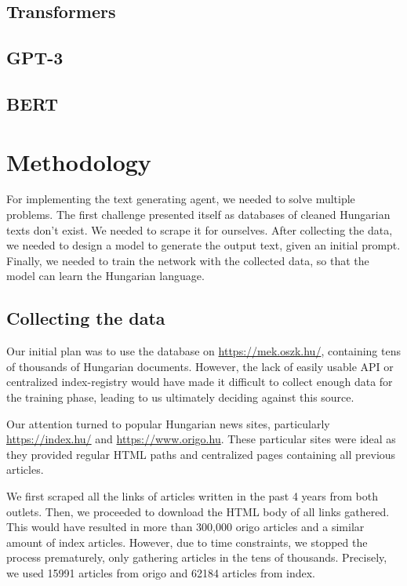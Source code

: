 \documentclass[journal]{IEEEtai}
\begin{document}
\subsection{Transformers}

\subsection{GPT-3}

\subsection{BERT}


\section{Methodology}
For implementing the text generating agent, we needed to solve multiple problems. The first challenge presented itself as databases of cleaned Hungarian texts don't exist. We needed to scrape it for ourselves. After collecting the data, we needed to design a model to generate the output text, given an initial prompt. Finally, we needed to train the network with the collected data, so that the model can learn the Hungarian language.  

\subsection{Collecting the data}
Our initial plan was to use the database on \href{https://mek.oszk.hu/}{https://mek.oszk.hu/}, containing tens of thousands of Hungarian documents. However, the lack of easily usable API or centralized index-registry would have made it difficult to collect enough data for the training phase, leading to us ultimately deciding against this source.

Our attention turned to popular Hungarian news sites, particularly \href{https://index.hu/}{https://index.hu/} and \href{https://www.origo.hu}{https://www.origo.hu}. These particular sites were ideal as they provided regular HTML paths and centralized pages containing all previous articles. 

We first scraped all the links of articles written in the past 4 years from both outlets. Then, we proceeded to download the HTML body of all links gathered. This would have resulted in more than 300,000 origo articles and a similar amount of index articles. However, due to time constraints, we stopped the process prematurely, only gathering articles in the tens of thousands. Precisely, we used 15991 articles from origo and 62184 articles from index.
\end{document}
